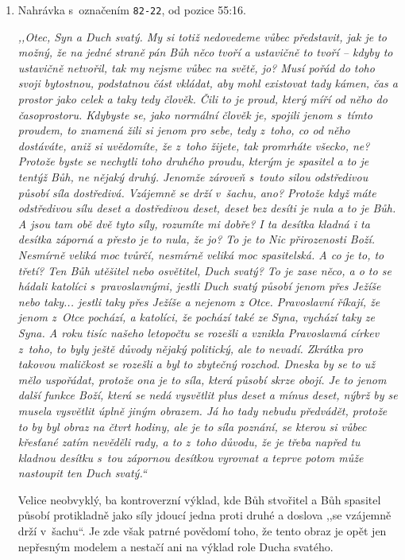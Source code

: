 \begin{enumerate}
{Tato pasáž krom Boží trojjedinosti silně promlouvá i k~tématu Božího řízení
        světa.
}

\item{%
Nahrávka s~označením \texttt{82-22}, od pozice 55:16.

\textit{%
,,Otec, Syn a Duch svatý. My si totiž nedovedeme vůbec představit, jak je
to možný, že na jedné straně pán Bůh něco tvoří a ustavičně to tvoří -- kdyby to
ustavičně netvořil, tak my nejsme vůbec na světě, jo? Musí pořád do toho svoji
bytostnou, podstatnou část vkládat, aby mohl existovat tady kámen, čas a prostor
jako celek a taky tedy člověk. Čili to je proud, který míří od něho do
časoprostoru. Kdybyste se, jako normální člověk je, spojili jenom s~tímto
proudem,
to znamená žili si jenom pro sebe, tedy z~toho, co od něho dostáváte, aniž si
uvědomíte, že z~toho žijete, tak promrháte všecko, ne? Protože byste se nechytli
toho druhého proudu, kterým je spasitel a to je tentýž Bůh, ne nějaký druhý.
Jenomže zároveň s~touto silou odstředivou působí síla dostředivá. Vzájemně se drží
v~šachu, ano? Protože když máte odstředivou sílu deset a dostředivou deset,
deset bez desíti je nula a to je Bůh. A jsou tam obě dvě tyto síly, rozumíte mi
dobře? I ta desítka kladná i ta desítka záporná a přesto je to nula, že jo? To je
to Nic přirozenosti Boží. Nesmírně veliká moc tvůrčí, nesmírně veliká moc
spasitelská. A co je to, to třetí? Ten Bůh utěšitel nebo osvětitel, Duch svatý?
To je zase něco, a o to se hádali katolíci s~pravoslavnými, jestli Duch svatý působí
jenom přes Ježíše nebo taky... jestli taky přes Ježíše a nejenom z Otce.
Pravoslavní říkají, že jenom z~Otce pochází, a katolíci, že pochází také ze
Syna,
vychází taky ze Syna. A roku tisíc našeho letopočtu se rozešli a vznikla
Pravoslavná církev z~toho, to byly ještě důvody nějaký politický, ale to nevadí.
Zkrátka pro takovou maličkost se rozešli a byl to zbytečný
rozchod. Dneska by se to už mělo uspořádat, protože ona je to síla, která
působí skrze obojí. Je to jenom další funkce Boží, která se nedá vysvětlit plus
deset a mínus deset, nýbrž by se musela vysvětlit úplně jiným obrazem. Já ho
tady nebudu předvádět, protože to by byl obraz na čtvrt hodiny, ale je to síla
poznání,
se kterou si vůbec křesťané zatím nevěděli rady, a to z~toho důvodu, že je třeba
napřed tu kladnou desítku s~tou zápornou desítkou vyrovnat a teprve potom může
nastoupit ten Duch svatý.``
}

Velice neobvyklý, ba kontroverzní výklad, kde Bůh stvořitel a Bůh spasitel
působí protikladně jako síly jdoucí jedna proti druhé a doslova ,,se vzájemně
drží v~šachu``. Je zde však patrné povědomí toho, že tento obraz je opět jen
nepřesným modelem a nestačí ani na výklad role Ducha svatého.

}
\end{enumerate}
